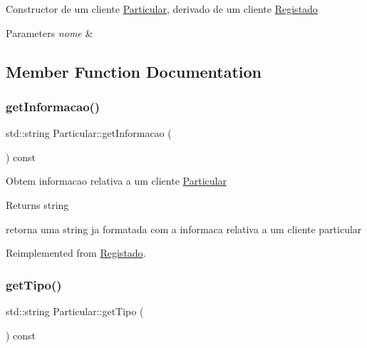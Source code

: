 Constructor de um cliente \hyperlink{class_particular}{Particular}, derivado de um cliente \hyperlink{class_registado}{Registado}


\begin{DoxyParams}{Parameters}
{\em nome} & \\
\hline
\end{DoxyParams}


\subsection{Member Function Documentation}
\mbox{\label{class_particular_acde85dcb3d26ca3afe131fb4c35763c8}} 
\subsubsection{\texorpdfstring{get\+Informacao()}{getInformacao()}}
{\footnotesize\ttfamily std\+::string Particular\+::get\+Informacao (\begin{DoxyParamCaption}{ }\end{DoxyParamCaption}) const\hspace{0.3cm}{\ttfamily [virtual]}}

Obtem informacao relativa a um cliente \hyperlink{class_particular}{Particular}

\begin{DoxyReturn}{Returns}
string
\end{DoxyReturn}
retorna uma string ja formatada com a informaca relativa a um cliente particular 

Reimplemented from \hyperlink{class_registado_a7017f0d74afd44459c3d6affcb303d52}{Registado}.

\mbox{\label{class_particular_ac7fc22a792b8c711d5f424ad9af19755}} 
\subsubsection{\texorpdfstring{get\+Tipo()}{getTipo()}}
{\footnotesize\ttfamily std\+::string Particular\+::get\+Tipo (\begin{DoxyParamCaption}{ }\end{DoxyParamCaption}) const\hspace{0.3cm}{\ttfamily [virtual]}}

